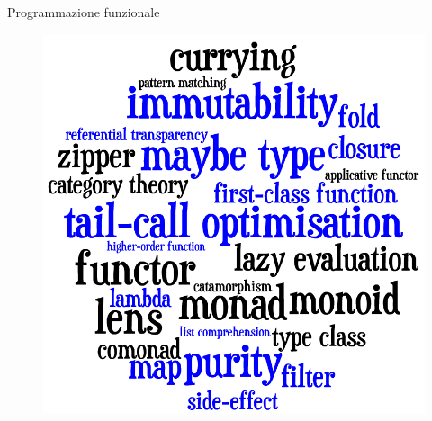 \begin{frame}{Programmazione funzionale}
	\begin{figure}
		\hspace*{-7cm}
		\includegraphics[scale=0.1]{res/functional}
	\end{figure}

\end{frame}